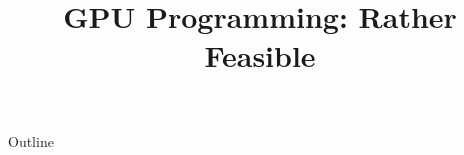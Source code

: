 \documentclass[11pt]{beamer}
\title{GPU Programming: Rather Feasible}
\begin{document}
    

    \begin{frame}
        \titlepage
    \end{frame}

    \begin{frame}{Outline}
        \tableofcontents
    \end{frame}

    
    
    
    
    
\end{document}
